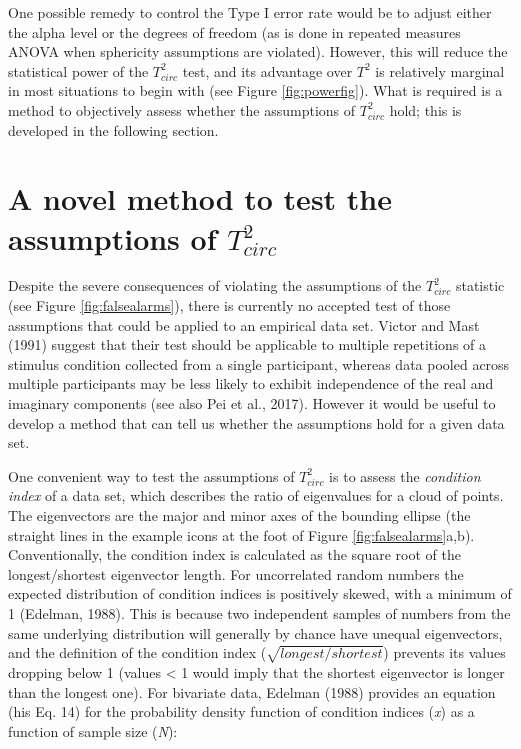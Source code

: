 \documentclass[]{article}
\begin{document}
One possible remedy to control the Type I error rate would be to adjust either the alpha level or the degrees of freedom (as is done in repeated measures ANOVA when sphericity assumptions are violated). However, this will reduce the statistical power of the \(T^2_{circ}\) test, and its advantage over \(T^2\) is relatively marginal in most situations to begin with (see Figure \ref{fig:powerfig}). What is required is a method to objectively assess whether the assumptions of \(T^2_{circ}\) hold; this is developed in the following section.

\hypertarget{a-novel-method-to-test-the-assumptions-of-t2_circ}{%
\section{\texorpdfstring{A novel method to test the assumptions of \(T^2_{circ}\)}{A novel method to test the assumptions of T\^{}2\_\{circ\}}}\label{a-novel-method-to-test-the-assumptions-of-t2_circ}}

Despite the severe consequences of violating the assumptions of the \(T^2_{circ}\) statistic (see Figure \ref{fig:falsealarms}), there is currently no accepted test of those assumptions that could be applied to an empirical data set. Victor and Mast (1991) suggest that their test should be applicable to multiple repetitions of a stimulus condition collected from a single participant, whereas data pooled across multiple participants may be less likely to exhibit independence of the real and imaginary components (see also Pei et al., 2017). However it would be useful to develop a method that can tell us whether the assumptions hold for a given data set.

One convenient way to test the assumptions of \(T^2_{circ}\) is to assess the \emph{condition index} of a data set, which describes the ratio of eigenvalues for a cloud of points. The eigenvectors are the major and minor axes of the bounding ellipse (the straight lines in the example icons at the foot of Figure \ref{fig:falsealarms}a,b). Conventionally, the condition index is calculated as the square root of the longest/shortest eigenvector length. For uncorrelated random numbers the expected distribution of condition indices is positively skewed, with a minimum of 1 (Edelman, 1988). This is because two independent samples of numbers from the same underlying distribution will generally by chance have unequal eigenvectors, and the definition of the condition index (\(\sqrt{longest/shortest}\)) prevents its values dropping below 1 (values \textless{} 1 would imply that the shortest eigenvector is longer than the longest one). For bivariate data, Edelman (1988) provides an equation (his Eq. 14) for the probability density function of condition indices (\emph{x}) as a function of sample size (\emph{N}):
\end{document}
